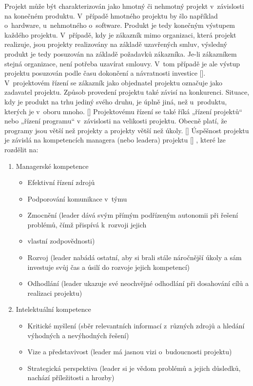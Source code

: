 \documentclass[
	11pt, oneside, printed, final, palatino, monochrome
	microtype,
	table,   %
	lof,     %
	lot     %
]{fithesis3}
\newcommand{\citepages}[2]{[\cite[#1]{#2}]}
\newcommand{\mezera}{\bigskip}
\begin{document}
{Projekt může být charakterizován jako hmotný či nehmotný projekt v~závislosti na konečném produktu. V~případě hmotného projektu by šlo například o~hardware, u~nehmotného o~software. Produkt je tedy konečným výstupem každého projektu.
V~případě, kdy je zákazník mimo organizaci, která projekt realizuje, jsou projekty realizovány na základě uzavřených smluv, výsledný produkt je tedy posuzován na základě požadavků zákazníka. Je-li zákazníkem stejná organizace, není potřeba uzavírat smlouvy. V~tom případě je ale výstup projektu posuzován podle času dokončení a návratnosti investice \citepages{10-12}{rosenau_2000}.  V~projektovém řízení se zákazník jako objednatel projektu označuje jako zadavatel projektu. Způsob provedení projektu také závisí na konkurenci. Situace, kdy je produkt na trhu jediný svého druhu, je úplně jiná, než u~produktu, kterých je v~oboru mnoho. \citepages{12}{rosenau_2000}
Projektovému řízení se také říká „řízení projektů“ nebo „řízení programu“ v~závislosti na velikosti projektu. Obecně platí, že programy jsou větší než projekty a projekty větší než úkoly. \citepages{12}{rosenau_2000}
Úspěšnost projektu je závislá na kompetencích managera (nebo leadera) projektu \citepages{437–448}{Muller2010437}
, které lze rozdělit na: 
\mezera
\begin{enumerate}
\item Managerské kompetence
\begin{itemize}
\item Efektivní řízení zdrojů
\item Podporování komunikace v~týmu
\item Zmocnění (leader dává svým přímým podřízeným autonomii při řešení problémů, čímž přispívá k~rozvoji jejich \item vlastní zodpovědnosti)
\item Rozvoj (leader nabádá ostatní, aby si brali stále náročnější úkoly a sám investuje svůj čas a úsilí do rozvoje jejich kompetencí)
\item Odhodlání (leader ukazuje své neochvějné odhodlání při dosahování cílů a realizaci projektu)
\end{itemize}
\item Intelektuální kompetence
\begin{itemize}
\item Kritické myšlení (sběr relevantních informací z~různých zdrojů a hledání výhodných a nevýhodných řešení)
\item Vize a představivost (leader má jasnou vizi o~budoucnosti projektu)
\item Strategická perspektiva (leader si je vědom problémů a jejich důsledků, nachází příležitosti a hrozby)

\end{itemize}
\end{enumerate}}
\end{document}
